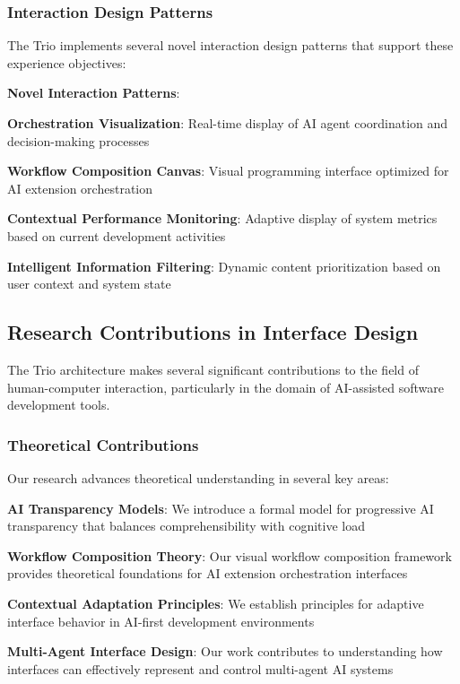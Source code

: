 \subsubsection*{Interaction Design Patterns}

The Trio implements several novel interaction design patterns that support these experience objectives:

\begin{successbox}
\textbf{Novel Interaction Patterns}:
\begin{compactlist}
    \item \textbf{Orchestration Visualization}: Real-time display of AI agent coordination and decision-making processes
    \item \textbf{Workflow Composition Canvas}: Visual programming interface optimized for AI extension orchestration
    \item \textbf{Contextual Performance Monitoring}: Adaptive display of system metrics based on current development activities
    \item \textbf{Intelligent Information Filtering}: Dynamic content prioritization based on user context and system state
\end{compactlist}
\end{successbox}

\subsection*{Research Contributions in Interface Design}

The Trio architecture makes several significant contributions to the field of human-computer interaction, particularly in the domain of AI-assisted software development tools.

\subsubsection*{Theoretical Contributions}

Our research advances theoretical understanding in several key areas:

\begin{expandedlist}
    \item \textbf{AI Transparency Models}: We introduce a formal model for progressive AI transparency that balances comprehensibility with cognitive load
    \item \textbf{Workflow Composition Theory}: Our visual workflow composition framework provides theoretical foundations for AI extension orchestration interfaces
    \item \textbf{Contextual Adaptation Principles}: We establish principles for adaptive interface behavior in AI-first development environments
    \item \textbf{Multi-Agent Interface Design}: Our work contributes to understanding how interfaces can effectively represent and control multi-agent AI systems
\end{expandedlist}

